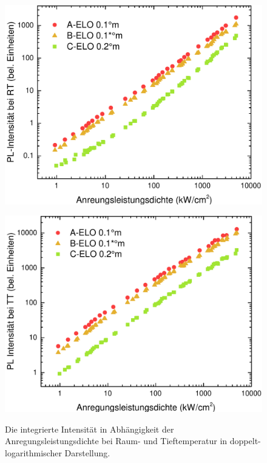 %
\begin{figure}[htb]
  \centering
  \begin{minipage}[t]{0.49\textwidth}
    \centering
    \includegraphics[width=\textwidth]{Bilder/TS4045/intRT.pdf}
    \label{fig:elointrt}
  \end{minipage}
	\hfill
  \begin{minipage}[t]{0.49\textwidth}
    \centering
    \includegraphics[width=\linewidth]{Bilder/TS4045/intTT.pdf}
    \label{fig:elointtt}
  \end{minipage}
	\caption{Die integrierte Intensität in Abhängigkeit der Anregungsleistungsdichte bei Raum- und Tieftemperatur in doppelt-logarithmischer Darstellung. }
\end{figure}
